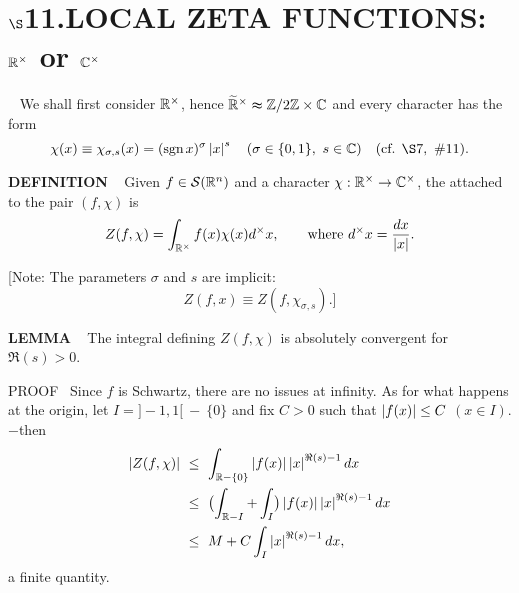 \chapter{
$\boldsymbol{\S}$\textbf{11}.\quad  LOCAL ZETA FUNCTIONS: $\mathbb{R}^\times$ or $\mathbb{C}^\times$}
\setlength\parindent{2em}
\setcounter{theoremn}{0}
\ \indent 
We shall first consider $\mathbb{R}^\times$, hence $\widetilde{\mathbb{R}}^\times \thickapprox \mathbb{Z} / 2 \mathbb{Z} \times \mathbb{C}$ and every character has the form
\[
\chi(x) \equiv \chi_{\sigma, s}(x) = (\sgn x)^\sigma \abs{x}^s \quad 
(\sigma \in \{0, 1\}, \ s \in \C) \quad 
(\text{cf. } \S7, \  \#11).
\]

\vspace{0.1cm}

\begin{x}{\small\bf DEFINITION} \ %
Given $f \in \mathcal{S}(\mathbb{R}^n)$ and a character $\chi: \mathbb{R}^\times \rightarrow \mathbb{C}^\times$, 
the 
 
attached to the pair $(f, \chi)$ is
\[
Z (f,\chi) = \int_{\mathbb{R}^\times} f(x) \chi(x) d^\times x, \qquad \text{where $d^\times x = \frac{dx}{\left\vert x\right\vert}$.}
\]

[Note: The parameters $\sigma$ and $s$ are implicit:
\[
Z(f,x) \equiv Z(f,\chi_{\sigma,s}).]
\]
\end{x}

\vspace{0.1cm}



\begin{x}{\small\bf LEMMA} \ %
The integral defining $Z(f,\chi)$ is absolutely convergent for $\Re(s) > 0$.

\vspace{0.1cm}

PROOF \   
Since $f$ is Schwartz, there are no issues at infinity.  
As for what happens at the origin, let $I = ]-1,1[ \ -\  \{0\}$ and fix $C > 0$ such that $\left\vert f(x)\right\vert \le C$ $(x \in I)$. $-$then
\begin{align*}
\left\vert Z(f,\chi)\right\vert \ 	
&\le\  \int_{\mathbb{R}- \{0\}} \left\vert f(x)\right\vert \left\vert x\right\vert^{\Re(s) - 1} dx\\	
&\le\   \bigl(\int_{\mathbb{R} - I} + \int_I\bigr) \left\vert f(x)\right\vert \left\vert x\right\vert^{\Re(s) - 1} dx\\	
&\le\   M + C \int_I \left\vert x\right\vert^{\Re(s) - 1} dx,
\end{align*}
a finite quantity.
\end{x}

\vspace{0.1cm}

